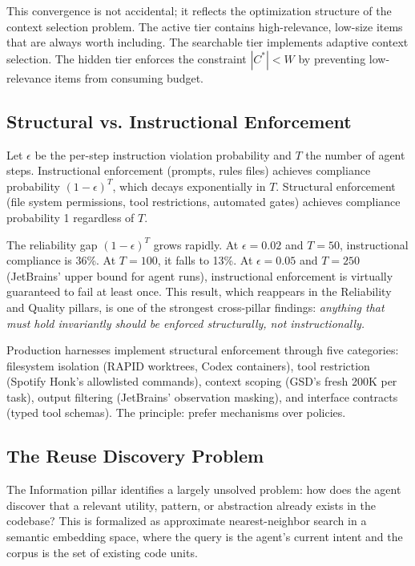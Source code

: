 This convergence is not accidental; it reflects the optimization structure of the context selection problem. The active tier contains high-relevance, low-size items that are always worth including. The searchable tier implements adaptive context selection. The hidden tier enforces the constraint $|C^*| < W$ by preventing low-relevance items from consuming budget.

\subsection{Structural vs. Instructional Enforcement}

\begin{proposition}
\label{prop:enforcement}
Let $\epsilon$ be the per-step instruction violation probability and $T$ the number of agent steps. Instructional enforcement (prompts, rules files) achieves compliance probability $(1-\epsilon)^T$, which decays exponentially in $T$. Structural enforcement (file system permissions, tool restrictions, automated gates) achieves compliance probability 1 regardless of $T$.
\end{proposition}

The reliability gap $(1-\epsilon)^T$ grows rapidly. At $\epsilon = 0.02$ and $T = 50$, instructional compliance is 36\%. At $T = 100$, it falls to 13\%. At $\epsilon = 0.05$ and $T = 250$ (JetBrains' upper bound for agent runs), instructional enforcement is virtually guaranteed to fail at least once. This result, which reappears in the Reliability and Quality pillars, is one of the strongest cross-pillar findings: \emph{anything that must hold invariantly should be enforced structurally, not instructionally.}

Production harnesses implement structural enforcement through five categories: filesystem isolation (RAPID worktrees, Codex containers), tool restriction (Spotify Honk's allowlisted commands), context scoping (GSD's fresh 200K per task), output filtering (JetBrains' observation masking), and interface contracts (typed tool schemas). The principle: prefer mechanisms over policies.

\subsection{The Reuse Discovery Problem}

The Information pillar identifies a largely unsolved problem: how does the agent discover that a relevant utility, pattern, or abstraction already exists in the codebase? This is formalized as approximate nearest-neighbor search in a semantic embedding space, where the query is the agent's current intent and the corpus is the set of existing code units.

